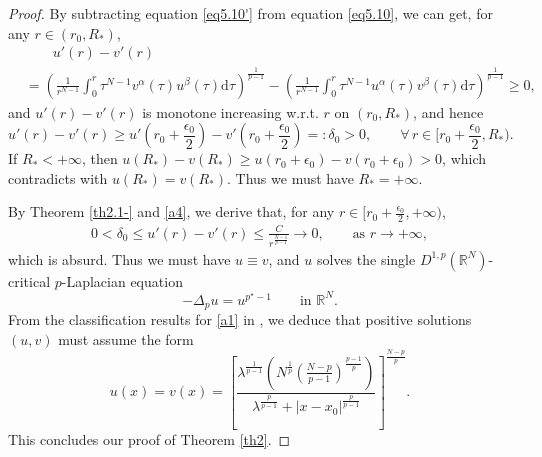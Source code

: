 \documentclass[12pt]{amsart}
\theoremstyle{definition}
\theoremstyle{remark}
\theoremstyle{conclusion}
\theoremstyle{conjecture}
\numberwithin{equation}{section}
\begin{document}
\begin{proof}
    By subtracting equation \eqref{eq5.10'} from equation \eqref{eq5.10}, we can get, for any $r\in(r_0,R_*)$,
\begin{align}\label{25q}
	&\quad \quad u'(r)-v'(r) \\
&=\left(\frac{1}{r^{N-1}} \int_0^r \tau^{N-1}v^\alpha(\tau) u^\beta(\tau) \mathrm{d}\tau\right)^{\frac{1}{p-1}}-\left(\frac{1}{r^{N-1}} \int_0^r \tau^{N-1}u^\alpha(\tau) v^\beta(\tau) \mathrm{d}\tau\right)^{\frac{1}{p-1}}\geq 0, \nonumber
\end{align}
and $u'(r)-v'(r)$ is monotone increasing w.r.t. $r$ on $(r_0,R_*)$, and hence
\begin{equation}\label{a4}
  u'(r)-v'(r)\geq u'\left(r_0+\frac{\epsilon_{0}}{2}\right)-v'\left(r_0+\frac{\epsilon_{0}}{2}\right)=:\delta_0>0, \qquad \forall \, r\in\Big[r_0+\frac{\epsilon_{0}}{2},R_*\Big).
\end{equation}
If $R_*<+\infty$, then $u(R_*)-v(R_*)\geq u(r_0+\epsilon_{0})-v(r_0+\epsilon_{0})>0$, which contradicts with $u(R_*)=v(R_*)$. Thus we must have $R_*=+\infty$.

By Theorem \ref{th2.1-} and \eqref{a4}, we derive that, for any $r\in[r_0+\frac{\epsilon_{0}}{2},+\infty)$,
\begin{align}\label{a5}
  0<\delta_0\leq u'(r)-v'(r)\leq \frac{C}{r^{\frac{N-1}{p-1}}}\rightarrow 0, \qquad \text{as} \,\, r\rightarrow+\infty,
\end{align}
which is absurd. Thus we must have $u\equiv v$, and $u$ solves the single $D^{1,p}(\mathbb{R}^{N})$-critical $p$-Laplacian equation
\begin{equation}\label{a1}
  -\Delta_{p} u=u^{p^{\star}-1} \qquad \text{in} \,\, \mathbb{R}^{N}.
\end{equation}
From the classification results for \eqref{a1} in \cite{LDSMLMSB,BS16,VJ16}, we deduce that positive solutions $(u,v)$ must assume the form
\[u(x)=v(x)=\left[ \frac{\lambda^{\frac{1}{p-1}}\left(N^{\frac{1}{p}}\left(\frac{N-p}{p-1}\right)^{\frac{p-1}{p}}\right)}{\lambda^{\frac{p}{p-1}}+|x-x_0|^{\frac{p}{p-1}}} \right]^{\frac{N-p}{p}}.\]
This concludes our proof of Theorem \ref{th2}.
\end{proof}
\end{document}
